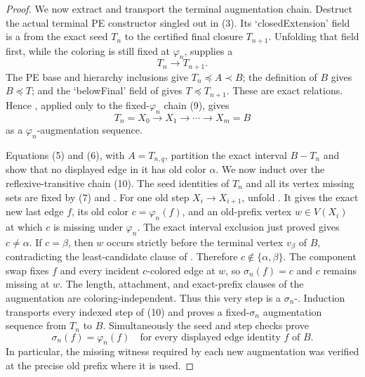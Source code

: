 \begin{proof}
We now extract and transport the terminal augmentation chain.  Destruct the
actual terminal PE constructor singled out in (3).  Its `closedExtension'
field is a  from the exact seed $T_n$ to the
certified final closure $T_{n+1}$.  Unfolding that field first, while the
coloring is still fixed at $\varphi_n$, supplies a
\[
                         T_n\longrightarrow T_{n+1}.            \tag{9}
\]
The PE base and hierarchy inclusions give
$T_n\preccurlyeq A\prec B$; the definition of $B$ gives
$B\preccurlyeq T$; and the `belowFinal' field of
 gives $T\preccurlyeq T_{n+1}$.  These are
exact  relations.  Hence
, applied only to the
fixed-$\varphi_n$ chain (9), gives
\[
       T_n=X_0\longrightarrow X_1\longrightarrow\cdots
             \longrightarrow X_m=B                             \tag{10}
\]
as a $\varphi_n$-augmentation sequence.

Equations (5) and (6), with $A=T_{n,q}$, partition the exact interval
$B-T_n$ and show that no displayed edge in it has old color $\alpha$.
We now induct over the reflexive-transitive chain (10).  The seed identities
of $T_n$ and all its vertex missing sets are fixed by (7) and
.  For one old step
$X_i\longrightarrow X_{i+1}$, unfold
.  It gives the exact new last edge $f$, its
old color $c=\varphi_n(f)$, and an old-prefix vertex $w\in V(X_i)$ at which
$c$ is missing under $\varphi_n$.  The exact interval exclusion just proved
gives $c\ne\alpha$.  If $c=\beta$, then $w$ occurs strictly before the
terminal vertex $v_\beta$ of $B$, contradicting the least-candidate clause
of .  Therefore
$c\notin\{\alpha,\beta\}$.  The component swap fixes $f$ and every incident
$c$-colored edge at $w$, so $\sigma_n(f)=c$ and $c$ remains missing at $w$.
The length, attachment, and exact-prefix clauses of the augmentation are
coloring-independent.  Thus this very step is a
$\sigma_n$-.  Induction transports every
indexed step of (10) and proves a fixed-$\sigma_n$ augmentation sequence
from $T_n$ to $B$.  Simultaneously the seed and step checks prove
\[
 \sigma_n(f)=\varphi_n(f)
 \quad\text{for every displayed edge identity }f\text{ of }B.  \tag{11}
\]
In particular, the missing witness required by each new augmentation was
verified at the precise old prefix where it is used.


\end{proof}
